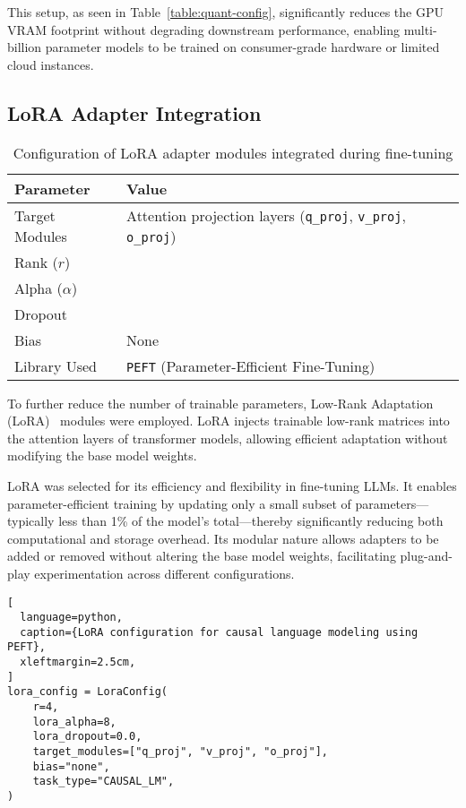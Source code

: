 This setup, as seen in Table~\ref{table:quant-config}, significantly reduces the GPU VRAM footprint
without degrading downstream performance, enabling multi-billion parameter models to
be trained on consumer-grade hardware or limited cloud instances.

\subsection{LoRA Adapter Integration}

\begin{table}[t]
  \centering
  \scriptsize
  \renewcommand{\arraystretch}{1.3}
  \begin{tabularx}{0.95\textwidth}{
    >{\raggedright\arraybackslash}p{5cm}
    >{\centering\arraybackslash}X
  }
    \toprule
    \textbf{Parameter} & \textbf{Value} \\
    \midrule
    Target Modules & Attention projection layers (\texttt{q\_proj}, \texttt{v\_proj}, \texttt{o\_proj}) \\
    Rank ($r$) & 4 \\
    Alpha ($\alpha$) & 8 \\
    Dropout & 0.0 \\
    Bias & None \\
    Library Used & \texttt{PEFT} (Parameter-Efficient Fine-Tuning) \\
    \bottomrule
  \end{tabularx}
  \caption{Configuration of LoRA adapter modules integrated during fine-tuning}
  \label{table:lora-adapter}
\end{table}

To further reduce the number of trainable parameters, Low-Rank Adaptation (LoRA)~\cite{hu2022lora}
modules were employed. LoRA injects trainable low-rank matrices into the attention
layers of transformer models, allowing efficient adaptation without modifying the base
model weights.

LoRA was selected for its efficiency and flexibility in fine-tuning LLMs. It enables
parameter-efficient training by updating only a small subset of parameters—typically less
than 1\% of the model's total—thereby significantly reducing both computational and
storage overhead. Its modular nature allows adapters to be added or removed without
altering the base model weights, facilitating plug-and-play experimentation across
different configurations.

\begin{lstlisting}[
  language=python,
  caption={LoRA configuration for causal language modeling using PEFT},
  xleftmargin=2.5cm,
]
lora_config = LoraConfig(
    r=4,
    lora_alpha=8,
    lora_dropout=0.0,
    target_modules=["q_proj", "v_proj", "o_proj"],
    bias="none",
    task_type="CAUSAL_LM",
)
\end{lstlisting}

